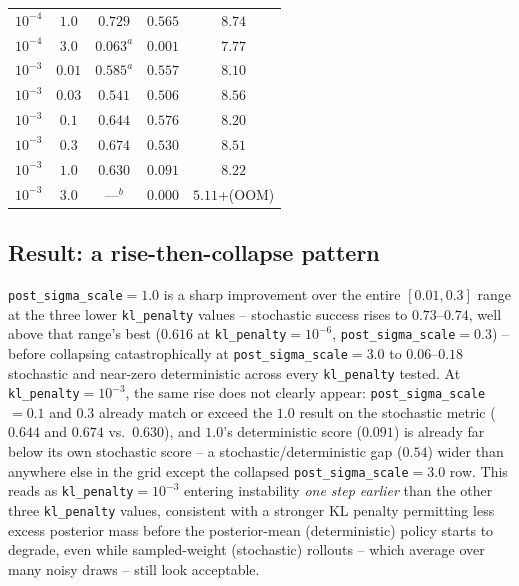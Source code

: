 \documentclass[11pt]{article}
\begin{document}
\begin{table}[H]
\begin{tabular}{ccccc}
$10^{-4}$ & $1.0$  & $\mathbf{0.729}$ & $0.565$    & $8.74$ \\
$10^{-4}$ & $3.0$  & $0.063^{a}$   & $0.001$       & $7.77$ \\
\midrule
$10^{-3}$ & $0.01$ & $0.585^{a}$   & $0.557$       & $8.10$ \\
$10^{-3}$ & $0.03$ & $0.541$       & $0.506$       & $8.56$ \\
$10^{-3}$ & $0.1$  & $0.644$       & $\mathbf{0.576}$ & $8.20$ \\
$10^{-3}$ & $0.3$  & $\mathbf{0.674}$ & $0.530$     & $8.51$ \\
$10^{-3}$ & $1.0$  & $0.630$       & $0.091$       & $8.22$ \\
$10^{-3}$ & $3.0$  & ---$^{b}$     & $0.000$       & $5.11$+(OOM) \\
\bottomrule
\end{tabular}
\end{table}

\subsection{Result: a rise-then-collapse pattern}

\texttt{post\_sigma\_scale}$=1.0$ is a sharp improvement over the entire
$[0.01,0.3]$ range at the three lower \texttt{kl\_penalty} values -- stochastic
success rises to $0.73$--$0.74$, well above that range's best ($0.616$ at
\texttt{kl\_penalty}$=10^{-6}$, \texttt{post\_sigma\_scale}$=0.3$) -- before
collapsing catastrophically at \texttt{post\_sigma\_scale}$=3.0$ to
$0.06$--$0.18$ stochastic and near-zero deterministic across every
\texttt{kl\_penalty} tested. At \texttt{kl\_penalty}$=10^{-3}$, the same rise
does not clearly appear: \texttt{post\_sigma\_scale}$=0.1$ and $0.3$ already
match or exceed the $1.0$ result on the stochastic metric ($0.644$ and
$\mathbf{0.674}$ vs.\ $0.630$), and $1.0$'s deterministic score ($0.091$) is
already far below its own stochastic score -- a stochastic/deterministic gap
($0.54$) wider than anywhere else in the grid except the collapsed
\texttt{post\_sigma\_scale}$=3.0$ row. This reads as \texttt{kl\_penalty}$=10^{-3}$
entering instability \emph{one step earlier} than the other three
\texttt{kl\_penalty} values, consistent with a stronger KL penalty permitting
less excess posterior mass before the posterior-mean (deterministic) policy
starts to degrade, even while sampled-weight (stochastic) rollouts -- which
average over many noisy draws -- still look acceptable.
\end{document}
